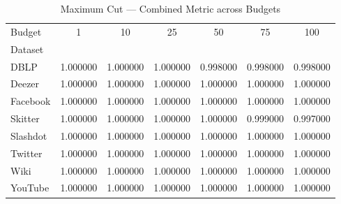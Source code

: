 \begin{table}
\caption{Maximum Cut — Combined Metric across Budgets}
\label{tab:maximum_cut}
\begin{tabular}{lcccccc}
\toprule
Budget & 1 & 10 & 25 & 50 & 75 & 100 \\
Dataset &  &  &  &  &  &  \\
\midrule
DBLP & 1.000000 & 1.000000 & 1.000000 & 0.998000 & 0.998000 & 0.998000 \\
Deezer & 1.000000 & 1.000000 & 1.000000 & 1.000000 & 1.000000 & 1.000000 \\
Facebook & 1.000000 & 1.000000 & 1.000000 & 1.000000 & 1.000000 & 1.000000 \\
Skitter & 1.000000 & 1.000000 & 1.000000 & 1.000000 & 0.999000 & 0.997000 \\
Slashdot & 1.000000 & 1.000000 & 1.000000 & 1.000000 & 1.000000 & 1.000000 \\
Twitter & 1.000000 & 1.000000 & 1.000000 & 1.000000 & 1.000000 & 1.000000 \\
Wiki & 1.000000 & 1.000000 & 1.000000 & 1.000000 & 1.000000 & 1.000000 \\
YouTube & 1.000000 & 1.000000 & 1.000000 & 1.000000 & 1.000000 & 1.000000 \\
\bottomrule
\end{tabular}
\end{table}
